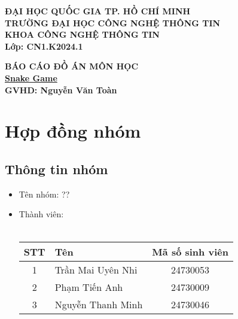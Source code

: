 \documentclass[a4paper, 12pt]{article}
\title{}
\author{}
\date{}
\begin{document}
\maketitle

\begin{center}
    \large \textbf{ĐẠI HỌC QUỐC GIA TP. HỒ CHÍ MINH}\\
    \large \textbf{TRƯỜNG ĐẠI HỌC CÔNG NGHỆ THÔNG TIN}\\
    \large \textbf{KHOA CÔNG NGHỆ THÔNG TIN}\\[2cm]
    
    \textbf{Lớp: CN1.K2024.1}\\
    \vspace{0.5cm}
    
    \vspace{2cm}
    \Large \textbf{BÁO CÁO ĐỒ ÁN MÔN HỌC}\\[0.5cm]
    \Large \textbf{\underline{Snake Game}}\\[0.5cm]
    \Large \textbf{GVHD: Nguyễn Văn Toàn}\\[0.5cm]
    \vspace{2cm}

    \vspace{1cm}
\end{center}

\newpage
\tableofcontents
\newpage

\section{Hợp đồng nhóm}
\subsection{Thông tin nhóm}
\begin{itemize}
    \item Tên nhóm: ??
    \item Thành viên:\\\\
        \begin{tabular}{|c|l|c|}
            \hline
            \textbf{STT} & \textbf{Tên} & \textbf{Mã số sinh viên} \\
            \hline
            1 & Trần Mai Uyên Nhi & 24730053 \\
            \hline
            2 & Phạm Tiến Anh & 24730009 \\
            \hline
            3 & Nguyễn Thanh Minh & 24730046 \\
            \hline
        \end{tabular}
\end{itemize}
\end{document}
